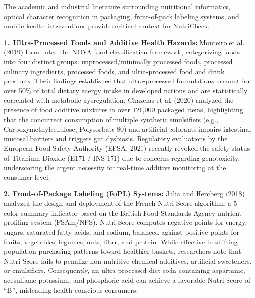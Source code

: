 \documentclass[12pt]{article}
\begin{document}
\noindent
The academic and industrial literature surrounding nutritional informatics, optical character recognition in packaging, front-of-pack labeling systems, and mobile health interventions provides critical context for NutriCheck.

\vspace{0.3cm}

\noindent
\textbf{1. Ultra-Processed Foods and Additive Health Hazards:}
Monteiro et al. (2019) formulated the NOVA food classification framework, categorizing foods into four distinct groups: unprocessed/minimally processed foods, processed culinary ingredients, processed foods, and ultra-processed food and drink products. Their findings established that ultra-processed formulations account for over 50\% of total dietary energy intake in developed nations and are statistically correlated with metabolic dysregulation. Chazelas et al. (2020) analyzed the presence of food additive mixtures in over 126,000 packaged items, highlighting that the concurrent consumption of multiple synthetic emulsifiers (e.g., Carboxymethylcellulose, Polysorbate 80) and artificial colorants impairs intestinal mucosal barriers and triggers gut dysbiosis. Regulatory evaluations by the European Food Safety Authority (EFSA, 2021) recently revoked the safety status of Titanium Dioxide (E171 / INS 171) due to concerns regarding genotoxicity, underscoring the urgent necessity for real-time additive monitoring at the consumer level.

\vspace{0.3cm}

\noindent
\textbf{2. Front-of-Package Labeling (FoPL) Systems:}
Julia and Hercberg (2018) analyzed the design and deployment of the French Nutri-Score algorithm, a 5-color summary indicator based on the British Food Standards Agency nutrient profiling system (FSAm/NPS). Nutri-Score computes negative points for energy, sugars, saturated fatty acids, and sodium, balanced against positive points for fruits, vegetables, legumes, nuts, fiber, and protein. While effective in shifting population purchasing patterns toward healthier baskets, researchers note that Nutri-Score fails to penalize non-nutritive chemical additives, artificial sweeteners, or emulsifiers. Consequently, an ultra-processed diet soda containing aspartame, acesulfame potassium, and phosphoric acid can achieve a favorable Nutri-Score of ``B'', misleading health-conscious consumers.

\vspace{0.3cm}
\end{document}
